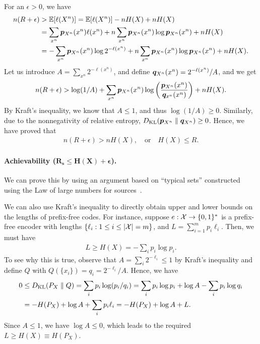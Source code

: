 \documentclass[12pt]{article}
\begin{document}
For an $\epsilon>0$, we have 
\begin{align}
	n(R+\epsilon) &> \mathbb{E}[\ell(X^n)] = \mathbb{E}[\ell(X^n)] - n H(X) + nH(X) \\
	& = \sum_{x^n} \boldsymbol{p}_{X^n}(x^n) \ell(x^n) + n \sum_{x^n} \boldsymbol{p}_{X^n}(x^n) \log \boldsymbol{p}_{X^n}(x^n) + nH(X) \\
	& = -\sum_{x^n} \boldsymbol{p}_{X^n}(x^n) \log 2^{-\ell(x^n)} + n \sum_{x^n} \boldsymbol{p}_{X^n}(x^n) \log \boldsymbol{p}_{X^n}(x^n) + nH(X). 
\end{align}
Let us introduce $A = \sum_{x^n} 2^{-\ell(x^n)}$, and define $\boldsymbol{q}_{X^n}(x^n) = 2^{-\ell(x^n)}/A$, and we get 
\begin{align}
	n(R+\epsilon) > \log(1/A) + \sum_{x^n} \boldsymbol{p}_{X^n}(x^n) \log \left(  \frac{\boldsymbol{p}_{X^n}(x^n)}{\boldsymbol{q}_{x^n}(x^n)}\right) + n H(X). 
\end{align}
By Kraft's inequality, we know that $A \leq 1$, and thus $\log(1/A) \geq 0$. Similarly, due to the nonnegativity of relative entropy, $D_{\text{KL}}(\boldsymbol{p}_{X^n} \parallel \boldsymbol{q}_{X^n}) \geq 0$.  Hence, we have proved that 
\begin{align}
	n(R+\epsilon) > n H(X), \quad \text{or} \quad 
	H(X) \leq R. 
\end{align}

\paragraph{Achievability ($\boldsymbol{R_s \leq H(X) + \epsilon}$).} We can prove this by using an argument based on ``typical sets'' constructed using the Law of large numbers for \iid sources~\cite[Chapter 3]{cover2006elements}.

We can also use Kraft's inequality to directly obtain upper and lower bounds on the lengths of prefix-free codes. For instance, suppose $e:{\cal X} \to \{0,1\}^*$ is a prefix-free encoder with lengths $\{\ell_i: 1 \leq i \leq |{\cal X}|=m\}$, and $L = \sum_{i=1}^m p_i \ell_i$. Then, we must have 
\begin{align}
    L \geq H(X) = - \sum_i p_i \log p_i. 
\end{align}
To see why this is true, observe that $A = \sum_i 2^{-\ell_i} \leq 1$ by Kraft's inequality and define $Q$ with $Q(\{x_i\}) = q_i = 2^{-\ell_i}/A$. Hence, we have 
\begin{align}
    0 &\leq  D_{\text{KL}}(P_X \parallel Q) = \sum_i p_i \log(p_i/q_i) = \sum_i p_i \log p_i + \log A - \sum_i p_i \log q_i \\
    & = - H(P_X) + \log A + \sum_i p_i \ell_i = -H(P_X) + \log A + L. 
\end{align}
Since $A \leq 1$, we have $\log A \leq 0$, which leads to the required $L \geq H(X) \equiv H(P_X)$. 
\end{document}
